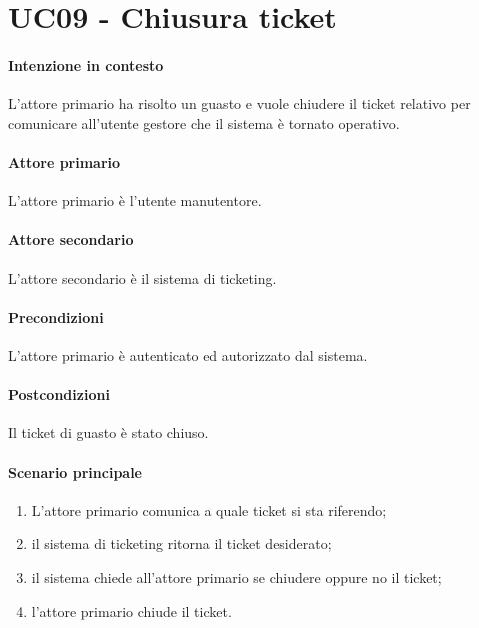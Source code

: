 \section{UC09 - Chiusura ticket}\label{uc:09}

\paragraph{Intenzione in contesto} L'attore primario ha risolto un guasto e vuole chiudere il ticket relativo per comunicare all'utente gestore che il sistema è tornato operativo.

\paragraph{Attore primario} L'attore primario è l'utente manutentore.
\paragraph{Attore secondario} L'attore secondario è il sistema di ticketing.

\paragraph{Precondizioni} L'attore primario è autenticato ed autorizzato dal sistema.

\paragraph{Postcondizioni} Il ticket di guasto è stato chiuso.

\paragraph{Scenario principale}

\begin{enumerate}
    \item L'attore primario comunica a quale ticket si sta riferendo;
    \item il sistema di ticketing ritorna il ticket desiderato;
    \item il sistema chiede all'attore primario se chiudere oppure no il ticket;
    \item l'attore primario chiude il ticket.
\end{enumerate}
